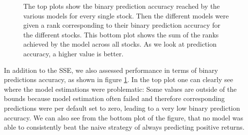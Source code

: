\begin{figure}[h!]
    \centering
    \begin{adjustbox}{width = 0.95\linewidth}
    
    \end{adjustbox}
    \vspace{1ex}
    \begin{adjustbox}{width = 0.95\linewidth}
    
    \end{adjustbox}
    \caption{The top plots show the binary prediction accuracy reached by the various models for every single stock. Then the different models were given a rank corresponding to their binary prediction accuracy for the different stocks. This bottom plot shows the sum of the ranks achieved by the model across all stocks. As we look at prediction accuracy, a higher value is better.}
    \label{fig:models_ranked_binary}
\end{figure}

In addition to the SSE, we also assessed performance in terms of binary predictions accuracy, as shown in figure \ref{fig:models_ranked_binary}. In the top plot one can clearly see where the model estimations were problematic: Some values are outside of the bounds because model estimation often failed and therefore corresponding predictions were per default set to zero, leading to a very low binary prediction accuracy. We can also see from the bottom plot of the figure, that no model was able to consistently beat the naive strategy of always predicting positive returns. 
